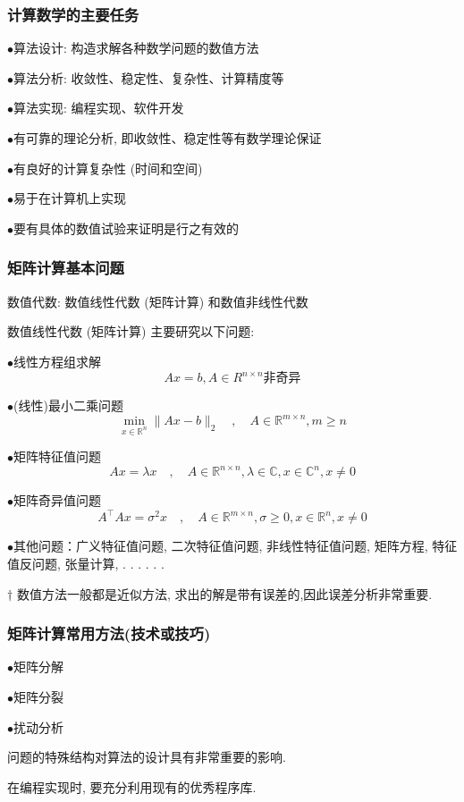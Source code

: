 \documentclass[notheorems,serif]{beamer}
\begin{document}
\begin{frame}
\frametitle{计算数学的主要任务}
$\bullet$算法设计: 构造求解各种数学问题的数值方法

$\bullet$算法分析: 收敛性、稳定性、复杂性、计算精度等

$\bullet$算法实现: 编程实现、软件开发

{}

$\bullet$有可靠的理论分析, 即收敛性、稳定性等有数学理论保证

$\bullet$有良好的计算复杂性 (时间和空间)

$\bullet$易于在计算机上实现

$\bullet$要有具体的数值试验来证明是行之有效的
\end{frame}

\begin{frame}
\frametitle{矩阵计算基本问题}
数值代数: 数值线性代数 (矩阵计算) 和数值非线性代数

数值线性代数 (矩阵计算) 主要研究以下问题:

\qquad$\bullet$线性方程组求解
$$Ax=b,A \in R^{n \times n}\text{非奇异}$$

\qquad$\bullet$(线性)最小二乘问题
$$
\min _{x \in \mathbb{R}^{n}}\|A x-b\|_{2} \quad, \quad A \in \mathbb{R}^{m \times n}, m \geq n
$$

\qquad$\bullet$矩阵特征值问题
$$
A x=\lambda x \quad, \quad A \in \mathbb{R}^{n \times n}, \lambda \in \mathbb{C}, x \in \mathbb{C}^{n}, x \neq 0
$$

\qquad$\bullet$矩阵奇异值问题
$$
A^{\top} A x=\sigma^{2} x \quad, \quad A \in \mathbb{R}^{m \times n}, \sigma \geq 0, x \in \mathbb{R}^{n}, x \neq 0
$$

\qquad$\bullet$其他问题：广义特征值问题, 二次特征值问题, 非线性特征值问题, 矩阵方程, 特征值反问题, 张量计算, . . . . . .

	{$\dagger$} 数值方法一般都是近似方法, 求出的解是带有误差的,因此误差分析非常重要.
	
\end{frame}

\begin{frame}
\frametitle{矩阵计算常用方法(技术或技巧)}
\qquad$\bullet$矩阵分解

\qquad$\bullet$矩阵分裂

\qquad$\bullet$扰动分析

{\red{$\dagger$}} 问题的特殊结构对算法的设计具有非常重要的影响.

{\red{$\dagger$}} 在编程实现时, 要充分利用现有的优秀程序库.
\end{frame}
\end{document}
